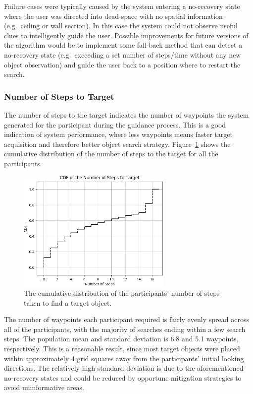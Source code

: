 \documentclass[a4paper, twoside]{article}
\begin{document}
Failure cases were typically caused by the system entering a no-recovery state where the user was directed into dead-space with no spatial information (e.g.\ ceiling or wall section). In this case the system could not observe useful clues to intelligently guide the user. Possible improvements for future versions of the algorithm would be to implement some fall-back method that can detect a no-recovery state (e.g.\ exceeding a set number of steps/time without any new object observation) and guide the user back to a position where to restart the search.

\subsubsection{Number of Steps to Target}

\noindent The number of steps to the target indicates the number of waypoints the system generated for the participant during the guidance process. This is a good indication of system performance, where less waypoints means faster target acquisition and therefore better object search strategy. Figure~\ref{fig:nsteps-participants} shows the cumulative distribution of the number of steps to the target for all the participants. 

\begin{figure}[b]
  \centering
  \includegraphics[height=5.9cm]{../figures/cdf_total_steps.png}
  \caption{The cumulative distribution of the participants' number of steps taken to find a target object. }\label{fig:nsteps-participants}
\end{figure}

The number of waypoints each participant required is fairly evenly spread across all of the participants, with the majority of searches ending within a few search steps. The population mean and standard deviation is 6.8 and 5.1 waypoints, respectively. This is a reasonable result, since most target objects were placed within approximately 4 grid squares away from the participants' initial looking directions. The relatively high standard deviation is due to the aforementioned no-recovery states and could be reduced by opportune mitigation strategies to avoid uninformative areas.
\end{document}
